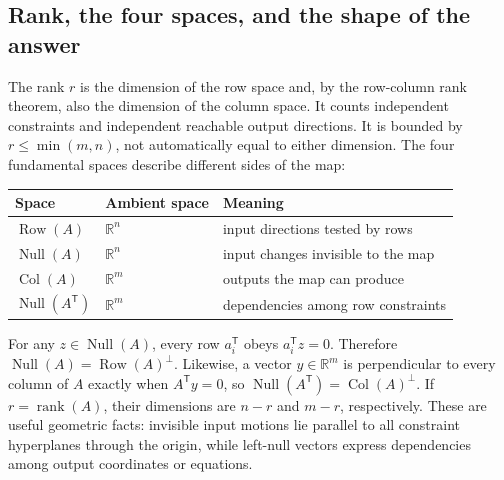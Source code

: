 \subsection{Rank, the four spaces, and the shape of the answer}\label{rank-the-four-spaces-and-the-shape-of-the-answer}

The rank \(r\) is the dimension of the row space and, by the row-column rank theorem, also the dimension of the column space. It counts independent constraints and independent reachable output directions. It is bounded by \(r\le\min(m,n)\), not automatically equal to either dimension. The four fundamental spaces describe different sides of the map:

{\def\LTcaptype{none} %
\begin{longtable}[]{@{}
  >{\raggedright\arraybackslash}p{}
  >{\raggedleft\arraybackslash}p{}
  >{\raggedright\arraybackslash}p{}@{}}
\toprule\noalign{}
\begin{minipage}[b]{\linewidth}\raggedright
Space
\end{minipage} & \begin{minipage}[b]{\linewidth}\raggedleft
Ambient space
\end{minipage} & \begin{minipage}[b]{\linewidth}\raggedright
Meaning
\end{minipage} \\
\midrule\noalign{}
\endhead
\bottomrule\noalign{}
\endlastfoot
\(\operatorname{Row}(A)\) & \(\mathbb R^n\) & input directions tested by rows \\
\(\operatorname{Null}(A)\) & \(\mathbb R^n\) & input changes invisible to the map \\
\(\operatorname{Col}(A)\) & \(\mathbb R^m\) & outputs the map can produce \\
\(\operatorname{Null}(A^\mathsf T)\) & \(\mathbb R^m\) & dependencies among row constraints \\
\end{longtable}
}

For any \(z\in\operatorname{Null}(A)\), every row \(a_i^\mathsf T\) obeys \(a_i^\mathsf Tz=0\). Therefore \(\operatorname{Null}(A)=\operatorname{Row}(A)^\perp\). Likewise, a vector \(y\in\mathbb R^m\) is perpendicular to every column of \(A\) exactly when \(A^\mathsf Ty=0\), so \(\operatorname{Null}(A^\mathsf T)=\operatorname{Col}(A)^\perp\). If \(r=\operatorname{rank}(A)\), their dimensions are \(n-r\) and \(m-r\), respectively. These are useful geometric facts: invisible input motions lie parallel to all constraint hyperplanes through the origin, while left-null vectors express dependencies among output coordinates or equations.

